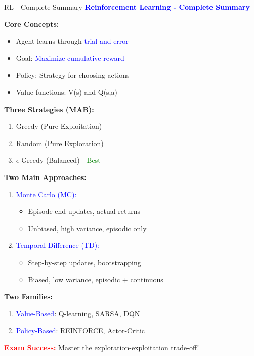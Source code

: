 \documentclass[8pt]{beamer}
\begin{document}
	\begin{frame}{RL - Complete Summary}
		\fontsize{6.5}{7.5}\selectfont
		\textcolor{blue}{\textbf{Reinforcement Learning - Complete Summary}}
		
		\textbf{Core Concepts:}
		\begin{itemize}
			\item Agent learns through \textcolor{blue}{trial and error}
			\item Goal: \textcolor{blue}{Maximize cumulative reward}
			\item Policy: Strategy for choosing actions
			\item Value functions: V(s) and Q(s,a)
		\end{itemize}
		
		\textbf{Three Strategies (MAB):}
		\begin{enumerate}
			\item Greedy (Pure Exploitation)
			\item Random (Pure Exploration)
			\item $\epsilon$-Greedy (Balanced) - \textcolor{green}{Best}
		\end{enumerate}
		
		\textbf{Two Main Approaches:}
		\begin{enumerate}
			\item \textcolor{blue}{Monte Carlo (MC):}
			\begin{itemize}
				\item Episode-end updates, actual returns
				\item Unbiased, high variance, episodic only
			\end{itemize}
			\item \textcolor{blue}{Temporal Difference (TD):}
			\begin{itemize}
				\item Step-by-step updates, bootstrapping
				\item Biased, low variance, episodic + continuous
			\end{itemize}
		\end{enumerate}
		
		\textbf{Two Families:}
		\begin{enumerate}
			\item \textcolor{blue}{Value-Based}: Q-learning, SARSA, DQN
			\item \textcolor{blue}{Policy-Based}: REINFORCE, Actor-Critic
		\end{enumerate}
		
		\textcolor{red}{\textbf{Exam Success:}} Master the exploration-exploitation trade-off!
	\end{frame}
	
\end{document}
